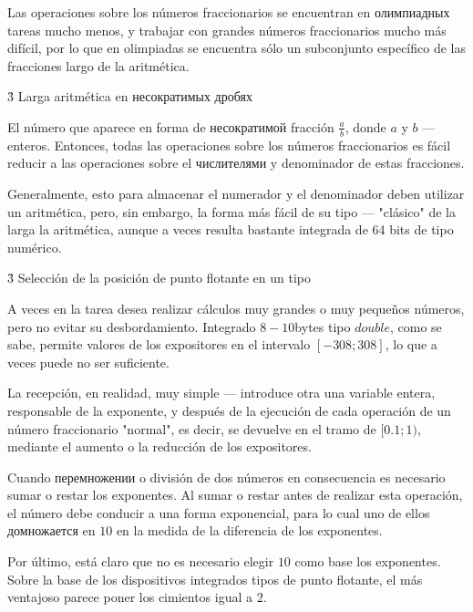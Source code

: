 Las operaciones sobre los números fraccionarios se encuentran en олимпиадных tareas mucho menos, y trabajar con grandes números fraccionarios mucho más difícil, por lo que en olimpiadas se encuentra sólo un subconjunto específico de las fracciones largo de la aritmética.


\h3{ Larga aritmética en несократимых дробях }

El número que aparece en forma de несократимой fracción $\frac{a}{b}$, donde $a$ y $b$ --- enteros. Entonces, todas las operaciones sobre los números fraccionarios es fácil reducir a las operaciones sobre el числителями y denominador de estas fracciones.

Generalmente, esto para almacenar el numerador y el denominador deben utilizar un aritmética, pero, sin embargo, la forma más fácil de su tipo --- "clásico" de la larga la aritmética, aunque a veces resulta bastante integrada de 64 bits de tipo numérico.


\h3{ Selección de la posición de punto flotante en un tipo }

A veces en la tarea desea realizar cálculos muy grandes o muy pequeños números, pero no evitar su desbordamiento. Integrado $8-10$bytes tipo $double$, como se sabe, permite valores de los expositores en el intervalo $[-308; 308]$, lo que a veces puede no ser suficiente.

La recepción, en realidad, muy simple --- introduce otra una variable entera, responsable de la exponente, y después de la ejecución de cada operación de un número fraccionario "normal", es decir, se devuelve en el tramo de $[0.1; 1)$, mediante el aumento o la reducción de los expositores.

Cuando перемножении o división de dos números en consecuencia es necesario sumar o restar los exponentes. Al sumar o restar antes de realizar esta operación, el número debe conducir a una forma exponencial, para lo cual uno de ellos домножается en $10$ en la medida de la diferencia de los exponentes.

Por último, está claro que no es necesario elegir $10$ como base los exponentes. Sobre la base de los dispositivos integrados tipos de punto flotante, el más ventajoso parece poner los cimientos igual a $2$.